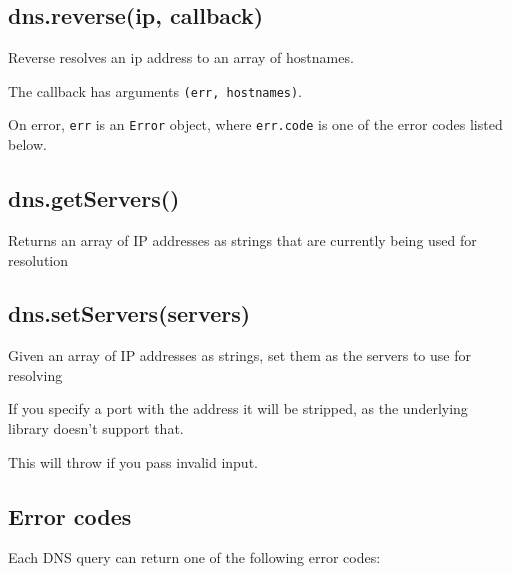 \subsection{dns.reverse(ip, callback)}\label{dns.reverseip-callback}

Reverse resolves an ip address to an array of hostnames.

The callback has arguments \texttt{(err,\ hostnames)}.

On error, \texttt{err} is an \texttt{Error} object, where
\texttt{err.code} is one of the error codes listed below.

\subsection{dns.getServers()}\label{dns.getservers}

Returns an array of IP addresses as strings that are currently being
used for resolution

\subsection{dns.setServers(servers)}\label{dns.setserversservers}

Given an array of IP addresses as strings, set them as the servers to
use for resolving

If you specify a port with the address it will be stripped, as the
underlying library doesn't support that.

This will throw if you pass invalid input.

\subsection{Error codes}\label{error-codes}

Each DNS query can return one of the following error codes:

